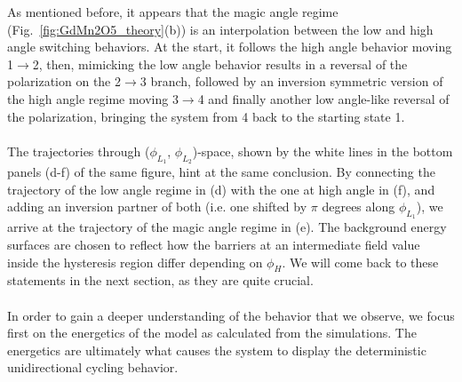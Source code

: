 As mentioned before, it appears that the magic angle regime (Fig.~\ref{fig:GdMn2O5_theory}(b)) is an interpolation between the low and high angle switching behaviors.
At the start, it follows the high angle behavior moving 1$\rightarrow$2, then, mimicking the low angle behavior results in a reversal of the polarization on the 2$\rightarrow$3 branch, followed by an inversion symmetric version of the high angle regime moving 3$\rightarrow$4 and finally another low angle-like reversal of the polarization, bringing the system from 4 back to the starting state 1. 
\\\\
The trajectories through ($\phi_{L_1}$, $\phi_{L_2}$)-space, shown by the white lines in the bottom panels (d-f) of the same figure, hint at the same conclusion.
By connecting the trajectory of the low angle regime in (d) with the one at high angle in (f), and adding an inversion partner of both (i.e. one shifted by $\pi$ degrees along $\phi_{L_1}$), we arrive at the trajectory of the magic angle regime in (e).
The background energy surfaces are chosen to reflect how the barriers at an intermediate field value inside the hysteresis region differ depending on $\phi_H$.
We will come back to these statements in the next section, as they are quite crucial.
\\\\
In order to gain a deeper understanding of the behavior that we observe, we focus first on the energetics of the model as calculated from the simulations.
The energetics are ultimately what causes the system to display the deterministic unidirectional cycling behavior.

